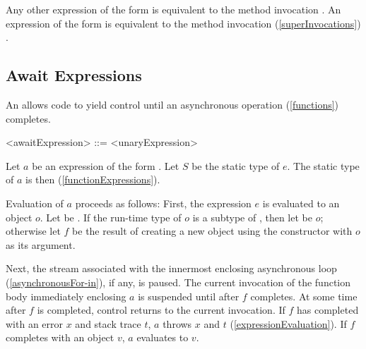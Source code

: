 \documentclass[makeidx]{article}
\begin{document}
{\LMHash{}%
Any other expression of the form  is equivalent to
the method invocation .
An expression of the form \code{\op\,\,\SUPER} is equivalent to
the method invocation (\ref{superInvocations}) .


\subsection{Await Expressions}

\LMHash{}%
An  allows code to
yield control until an asynchronous operation
(\ref{functions})
completes.

\begin{grammar}
<awaitExpression> ::= \AWAIT{} <unaryExpression>
\end{grammar}

\LMHash{}%
%
Let $a$ be an expression of the form .
Let $S$ be the static type of $e$.
The static type of $a$ is then 
(\ref{functionExpressions}).

\LMHash{}%
Evaluation of $a$ proceeds as follows:
First, the expression $e$ is evaluated to an object $o$.
Let  be .
If the run-time type of $o$ is a subtype of ,
then let  be $o$;
otherwise let $f$ be the result of creating
a new object using the constructor 
with $o$ as its argument.

\LMHash{}%
Next, the stream associated with
the innermost enclosing asynchronous \FOR{} loop
(\ref{asynchronousFor-in}),
if any, is paused.
The current invocation of the function body immediately enclosing $a$
is suspended until after $f$ completes.
At some time after $f$ is completed, control returns to the current invocation.
If $f$ has completed with an error $x$ and stack trace $t$,
$a$ throws $x$ and $t$
(\ref{expressionEvaluation}).
If $f$ completes with an object $v$, $a$ evaluates to $v$.


}
\end{document}

